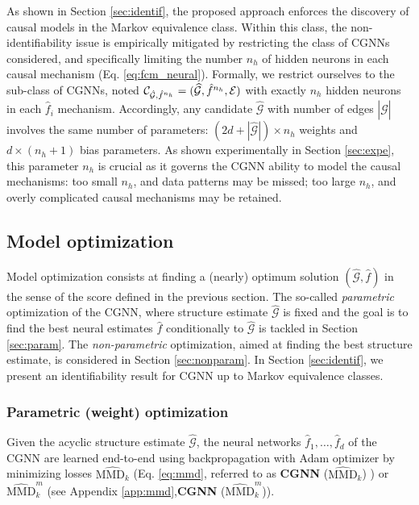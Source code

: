 \documentclass[a4paper, 11pt]{article}
\begin{document}
As shown in Section \ref{sec:identif}, the proposed approach enforces the discovery of causal models in the Markov equivalence class. Within this class, the non-identifiability issue is empirically mitigated by restricting the class of CGNNs considered, and specifically limiting the number $n_h$ of hidden neurons in each causal mechanism (Eq. \ref{eq:fcm_neural}). Formally, we restrict ourselves to the sub-class of CGNNs, noted $\mathcal{C}_{\hat{\cal G},\hat{f}^{n_h}} = (\widehat{\mathcal{G}}, \hat{f}^{n_h}, \mathcal{E})$ with exactly $n_h$ hidden neurons in each  $\hat{f}_i$ mechanism. Accordingly, any candidate  $\hat{\mathcal{G}}$ with number of edges $|\hat{\mathcal{G}}|$ involves the same number of parameters: $(2d+|\hat{\mathcal{G}}|) \times n_h$ weights and $d \times (n_h + 1 )$ bias parameters. As shown experimentally in Section \ref{sec:expe}, this parameter $n_h$ is crucial as it governs the CGNN ability to model the causal mechanisms: too small $n_h$, and data patterns may be missed; too large $n_h$, and overly complicated causal mechanisms may be retained.


\subsection{Model optimization \label{sec:optim}}

 Model optimization consists at finding a (nearly) optimum solution $(\hat{\mathcal{G}}, \hat{f})$ in the sense of the score defined in the previous section. 
  The so-called {\em parametric} optimization of the CGNN, where structure estimate $\hat{\mathcal{G}}$ is fixed and the goal is to find the best neural estimates $\hat{f}$ conditionally to $\hat{\mathcal{G}}$ is tackled in Section \ref{sec:param}. The {\em non-parametric} optimization, aimed at finding the best structure estimate, is considered in Section \ref{sec:nonparam}. In Section \ref{sec:identif}, we present an identifiability result for CGNN up to Markov equivalence classes.

  
\subsubsection{Parametric (weight) optimization \label{sec:param}}

 Given the acyclic structure estimate $\hat{\mathcal{G}}$, the neural networks $\hat{f}_1, \ldots, \hat{f}_d$ of the CGNN are learned end-to-end using backpropagation with Adam optimizer \citep{2014arXiv1412.6980K} by minimizing losses $\widehat{\text{MMD}_k}$ (Eq. \eqref{eq:mmd}, referred to as \textbf{CGNN} ($\widehat{\text{MMD}}_k$) ) or $\widehat{\text{MMD}}_k^m$ (see Appendix \ref{app:mmd},\textbf{CGNN} ($\widehat{\text{MMD}}^m_k$)).
\end{document}
